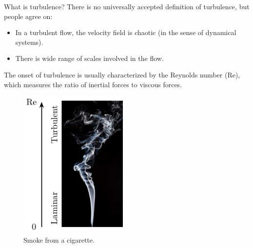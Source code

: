 \documentclass{beamer} %
\begin{document}
\begin{frame}{What is turbulence?}
	There is no universally accepted definition of turbulence, but people agree on:
	\begin{itemize}
		\item In a turbulent flow, the velocity field is chaotic (in the sense of dynamical systems).
		\item There is wide range of scales involved in the flow.
	\end{itemize}

	\begin{minipage}{0.48\textwidth}
		The onset of turbulence is usually characterized by the \textcolor{\mycolorhighlight}{Reynolds number} (Re), which measures the ratio of inertial forces to viscous forces.
	\end{minipage}\hfill
	\begin{minipage}{0.48\textwidth}
		\begin{figure}
			\centering
			\includegraphics[width=0.48\textwidth]{images/arrowRe.pdf}
			\caption{Smoke from a cigarette.}
		\end{figure}
	\end{minipage}
\end{frame}
\end{document}
